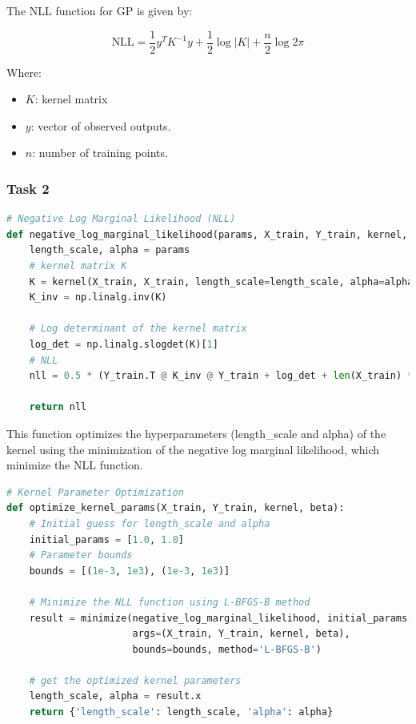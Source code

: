 \documentclass{homework}
\begin{document}
The NLL function for GP is given by:

\[
\text{NLL} = \frac{1}{2} y^T K^{-1} y + \frac{1}{2} \log |K| + \frac{n}{2} \log 2 \pi
\]

Where:

\begin{itemize}
    \item \( K \): kernel matrix%
    \item \( y \): vector of observed outputs.
    \item \( n \): number of training points.
\end{itemize}

\subsubsection{Task 2}

\begin{lstlisting}[language=Python]
# Negative Log Marginal Likelihood (NLL)
def negative_log_marginal_likelihood(params, X_train, Y_train, kernel, beta):
    length_scale, alpha = params
    # kernel matrix K
    K = kernel(X_train, X_train, length_scale=length_scale, alpha=alpha) + np.eye(len(X_train)) / beta
    K_inv = np.linalg.inv(K)
    
    # Log determinant of the kernel matrix
    log_det = np.linalg.slogdet(K)[1]
    # NLL
    nll = 0.5 * (Y_train.T @ K_inv @ Y_train + log_det + len(X_train) * np.log(2 * np.pi))
    
    return nll
\end{lstlisting}

This function optimizes the hyperparameters (length\_scale and alpha) of the kernel using the minimization of the negative log marginal likelihood, which minimize the NLL function.


\begin{lstlisting}[language=Python]
# Kernel Parameter Optimization
def optimize_kernel_params(X_train, Y_train, kernel, beta):
    # Initial guess for length_scale and alpha
    initial_params = [1.0, 1.0]
    # Parameter bounds
    bounds = [(1e-3, 1e3), (1e-3, 1e3)]
    
    # Minimize the NLL function using L-BFGS-B method
    result = minimize(negative_log_marginal_likelihood, initial_params, 
                      args=(X_train, Y_train, kernel, beta),
                      bounds=bounds, method='L-BFGS-B')
    
    # get the optimized kernel parameters
    length_scale, alpha = result.x
    return {'length_scale': length_scale, 'alpha': alpha}
\end{lstlisting}
\end{document}
